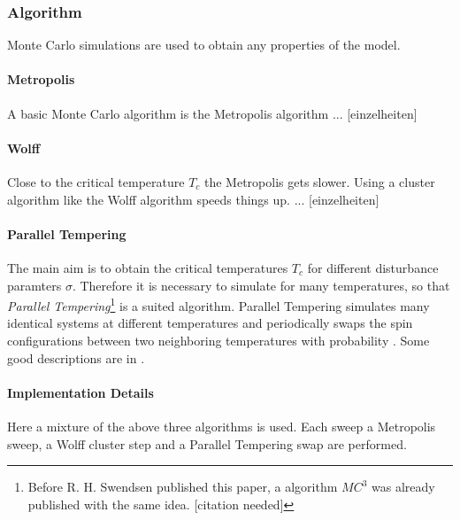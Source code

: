 \subsubsection{Algorithm}
    Monte Carlo simulations are used to obtain any properties of the
    model.
    \paragraph{Metropolis}
        A basic Monte Carlo algorithm is the Metropolis algorithm
        \cite{Metropolis1953} ... [einzelheiten]
    \paragraph{Wolff}
        Close to the critical temperature \(T_c\) the Metropolis
        gets slower. Using a cluster algorithm like the Wolff
        algorithm \cite{Wolff1989} speeds things up.
        ... [einzelheiten]
    \paragraph{Parallel Tempering}
        The main aim is to obtain the critical temperatures
        \(T_c\) for different disturbance paramters \(\sigma\).
        Therefore it is necessary to simulate for many temperatures,
        so that \emph{Parallel Tempering}\footnote{Before R. H.
            Swendsen published this paper, a algorithm \(MC^3\) was
            already published with the same idea. [citation needed]}
        \cite{ParallelTempering1986} is a suited algorithm. Parallel
        Tempering simulates many identical systems at different
        temperatures and periodically swaps the spin configurations
        between two neighboring temperatures with probability
        \(\). Some good descriptions are in
        \cite[S. ??]{NewmanBarkema1999} \cite[S. 155ff]{Katzgraber2011}.
    \paragraph{Implementation Details}
        Here a mixture of the above three algorithms is used.
        Each sweep a Metropolis sweep, a Wolff cluster step and a
        Parallel Tempering swap are performed.
